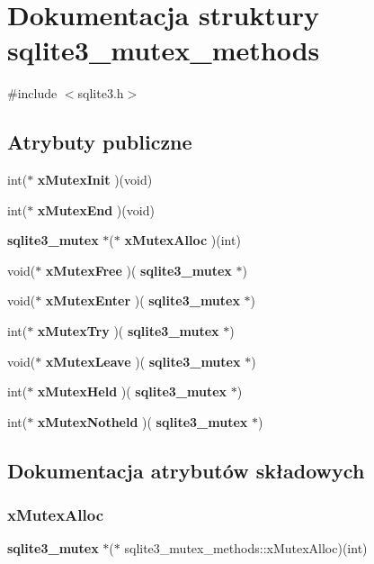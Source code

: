 \section{Dokumentacja struktury sqlite3\+\_\+mutex\+\_\+methods}
\label{structsqlite3__mutex__methods}


{\ttfamily \#include $<$sqlite3.\+h$>$}

\subsection*{Atrybuty publiczne}
\begin{DoxyCompactItemize}
\item 
int($\ast$ \textbf{ x\+Mutex\+Init} )(void)
\item 
int($\ast$ \textbf{ x\+Mutex\+End} )(void)
\item 
\textbf{ sqlite3\+\_\+mutex} $\ast$($\ast$ \textbf{ x\+Mutex\+Alloc} )(int)
\item 
void($\ast$ \textbf{ x\+Mutex\+Free} )(\textbf{ sqlite3\+\_\+mutex} $\ast$)
\item 
void($\ast$ \textbf{ x\+Mutex\+Enter} )(\textbf{ sqlite3\+\_\+mutex} $\ast$)
\item 
int($\ast$ \textbf{ x\+Mutex\+Try} )(\textbf{ sqlite3\+\_\+mutex} $\ast$)
\item 
void($\ast$ \textbf{ x\+Mutex\+Leave} )(\textbf{ sqlite3\+\_\+mutex} $\ast$)
\item 
int($\ast$ \textbf{ x\+Mutex\+Held} )(\textbf{ sqlite3\+\_\+mutex} $\ast$)
\item 
int($\ast$ \textbf{ x\+Mutex\+Notheld} )(\textbf{ sqlite3\+\_\+mutex} $\ast$)
\end{DoxyCompactItemize}


\subsection{Dokumentacja atrybutów składowych}
\mbox{\label{structsqlite3__mutex__methods_a1092d5c1659c494c5235e884def5e275}} 
\subsubsection{xMutexAlloc}
{\footnotesize\ttfamily \textbf{ sqlite3\+\_\+mutex} $\ast$($\ast$ sqlite3\+\_\+mutex\+\_\+methods\+::x\+Mutex\+Alloc)(int)}

